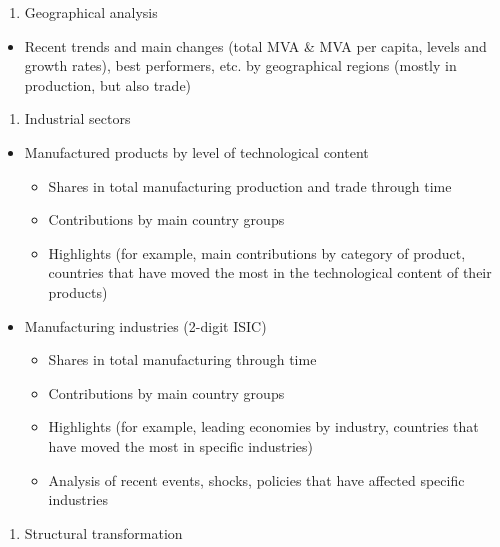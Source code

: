 \documentclass[
  openany, nofonts]{tufte-book}
\providecommand{\tightlist}{%
  \setlength{\itemsep}{0pt}\setlength{\parskip}{0pt}}
\begin{document}
\begin{enumerate}
\def\labelenumi{(\arabic{enumi})}
\setcounter{enumi}{3}
\tightlist
\item
  Geographical analysis
\end{enumerate}

\begin{itemize}
\tightlist
\item
  Recent trends and main changes (total MVA \& MVA per capita, levels and growth rates), best performers, etc. by geographical regions (mostly in production, but also trade)
\end{itemize}

\begin{enumerate}
\def\labelenumi{(\arabic{enumi})}
\setcounter{enumi}{4}
\tightlist
\item
  Industrial sectors
\end{enumerate}

\begin{itemize}
\tightlist
\item
  Manufactured products by level of technological content

  \begin{itemize}
  \tightlist
  \item
    Shares in total manufacturing production and trade through time
  \item
    Contributions by main country groups
  \item
    Highlights (for example, main contributions by category of product, countries that have moved the most in the technological content of their products)
  \end{itemize}
\item
  Manufacturing industries (2-digit ISIC)

  \begin{itemize}
  \tightlist
  \item
    Shares in total manufacturing through time
  \item
    Contributions by main country groups
  \item
    Highlights (for example, leading economies by industry, countries that have moved the most in specific industries)
  \item
    Analysis of recent events, shocks, policies that have affected specific industries
  \end{itemize}
\end{itemize}

\begin{enumerate}
\def\labelenumi{(\arabic{enumi})}
\setcounter{enumi}{5}
\tightlist
\item
  Structural transformation
\end{enumerate}
\end{document}
